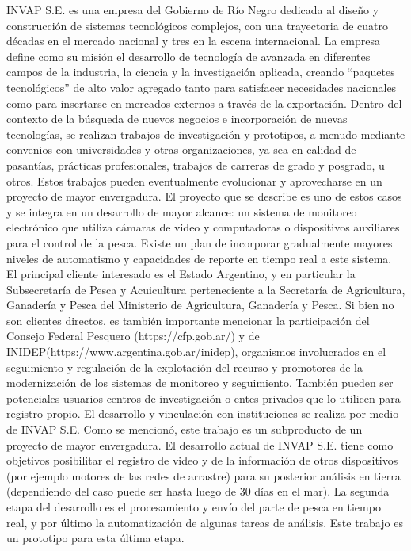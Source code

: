 \documentclass[11pt]{charter}
\begin{document}
INVAP S.E. es una empresa del Gobierno de Río Negro dedicada al diseño y construcción de sistemas tecnológicos complejos, con una trayectoria de cuatro décadas en el mercado nacional y tres en la escena internacional. La empresa define como su misión el desarrollo de tecnología de avanzada en diferentes campos de la industria, la ciencia y la investigación aplicada, creando “paquetes tecnológicos” de alto valor agregado tanto para satisfacer necesidades nacionales como para insertarse en mercados externos a través de la exportación.
Dentro del contexto de la búsqueda de nuevos negocios e incorporación de nuevas tecnologías, se realizan trabajos de investigación y prototipos, a menudo mediante convenios con universidades y otras organizaciones, ya sea en calidad de pasantías, prácticas profesionales, trabajos de carreras de grado y posgrado, u otros. Estos trabajos pueden eventualmente evolucionar y aprovecharse en un proyecto de mayor envergadura.
El proyecto que se describe es uno de estos casos y se integra en un desarrollo de mayor alcance: un sistema de monitoreo electrónico que utiliza cámaras de video y computadoras o dispositivos auxiliares para el control de la pesca. Existe un plan de incorporar gradualmente mayores niveles de automatismo y capacidades de reporte en tiempo real a este sistema. 
El principal cliente interesado es el Estado Argentino, y en particular la Subsecretaría de Pesca y Acuicultura perteneciente a la Secretaría de Agricultura, Ganadería y Pesca del Ministerio de Agricultura, Ganadería y Pesca. Si bien no son clientes directos, es también importante mencionar la participación del Consejo Federal Pesquero (https://cfp.gob.ar/) y de INIDEP(https://www.argentina.gob.ar/inidep), organismos involucrados en el seguimiento y regulación de la explotación del recurso y promotores de la modernización de los sistemas de monitoreo y seguimiento. También pueden ser potenciales usuarios centros de investigación o entes privados que lo utilicen para registro propio. El desarrollo y vinculación con instituciones se realiza por medio de INVAP S.E.
Como se mencionó, este trabajo es un subproducto de un proyecto de mayor envergadura. El desarrollo actual de INVAP S.E. tiene como objetivos posibilitar el registro de video y de la información de otros dispositivos (por ejemplo motores de las redes de arrastre) para su posterior análisis en tierra (dependiendo del caso puede ser hasta luego de 30 días en el mar). La segunda etapa del desarrollo es el procesamiento y envío del parte de pesca en tiempo real, y por último la automatización de algunas tareas de análisis. Este trabajo es un prototipo para esta última etapa. 
\end{document}
